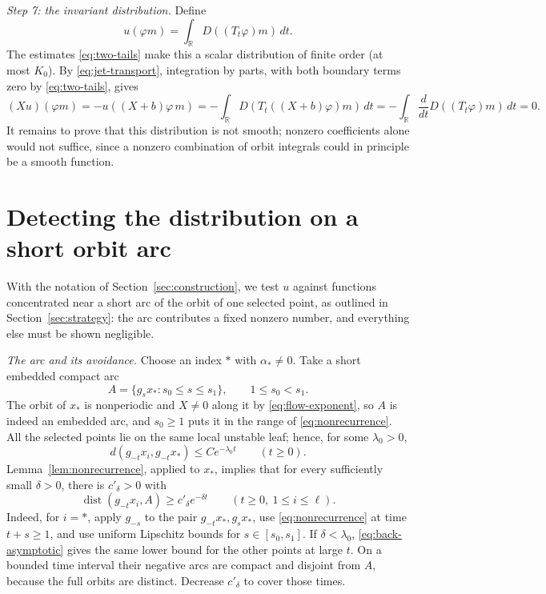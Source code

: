 \documentclass[11pt]{article}
\theoremstyle{remark}
\newcommand{\R}{\mathbb R}
\newcommand{\dist}{\operatorname{dist}}
\begin{document}
\emph{Step 7: the invariant distribution.}
Define
\begin{equation}\label{eq:invariant-u}
 u(\varphi m)=\int_{\R}D((T_t\varphi)m)\,dt.
\end{equation}
The estimates \eqref{eq:two-tails} make this a scalar distribution of
finite order (at most \(K_0\)).
By \eqref{eq:jet-transport}, integration by parts, with both boundary
terms zero by \eqref{eq:two-tails}, gives
\begin{equation}\label{eq:Xu-zero}
 (Xu)(\varphi m)
  =-u((X+b)\varphi\,m)
  =-\int_{\R}D(T_t((X+b)\varphi)m)\,dt
  =-\int_{\R}\frac{d}{dt}D((T_t\varphi)m)\,dt=0.
\end{equation}
It remains to prove that this distribution is not smooth; nonzero
coefficients alone would not suffice, since a nonzero combination of
orbit integrals could in principle be a smooth function.

\section{Detecting the distribution on a short orbit arc}
\label{sec:detection}

With the notation of Section~\ref{sec:construction}, we test
\(u\) against functions concentrated near a short arc of the orbit of
one selected point, as outlined in Section~\ref{sec:strategy}: the
arc contributes a fixed nonzero number, and everything else must be
shown negligible.

\emph{The arc and its avoidance.}
Choose an index \(*\) with \(\alpha_*\ne0\).
Take a short embedded compact arc
\[
 A=\{g_sx_*:s_0\le s\le s_1\},\qquad 1\le s_0<s_1 .
\]
The orbit of \(x_*\) is nonperiodic and \(X\ne0\) along it by
\eqref{eq:flow-exponent}, so \(A\) is indeed
an embedded arc, and \(s_0\ge1\) puts it in the range of
\eqref{eq:nonrecurrence}.
All the selected points lie on the same local unstable leaf; hence, for
some \(\lambda_0>0\),
\begin{equation}\label{eq:back-asymptotic}
 d(g_{-t}x_i,g_{-t}x_*)\le Ce^{-\lambda_0t}
                           \qquad(t\ge0).
\end{equation}
Lemma~\ref{lem:nonrecurrence}, applied to \(x_*\), implies that for
every sufficiently small \(\delta>0\), there is \(c'_\delta>0\) with
\begin{equation}\label{eq:arc-avoid}
 \dist(g_{-t}x_i,A)\ge c'_\delta e^{-\delta t}
                   \qquad(t\ge0,\ 1\le i\le\ell).
\end{equation}
Indeed, for \(i=*\), apply \(g_{-s}\) to the pair
\(g_{-t}x_*,g_sx_*\), use \eqref{eq:nonrecurrence} at time \(t+s\ge1\),
and use uniform Lipschitz bounds for \(s\in[s_0,s_1]\).
If \(\delta<\lambda_0\), \eqref{eq:back-asymptotic} gives the same
lower bound for the other points at large \(t\).
On a bounded time interval their negative arcs are compact and
disjoint from \(A\), because the full orbits are distinct.
Decrease \(c'_\delta\) to cover those times.
\end{document}
